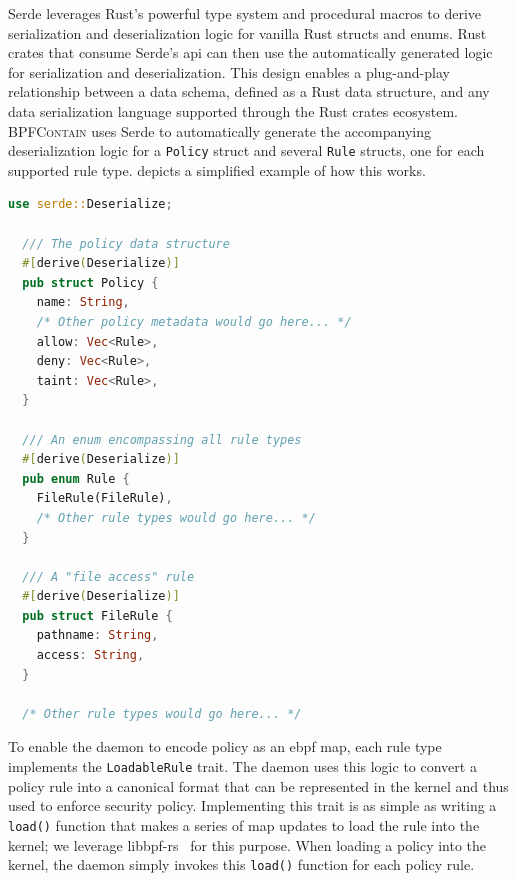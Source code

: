 \documentclass[
  fontsize=12pt,
  titlepage=firstiscover,
  paper=letter,
oneside,
  cleardoublepage=plain,
  parskip=half-,
  DIV=10,
  parindent,
  appendixprefix,
  chapterprefix,
  listof=totoc,
]{scrbook}
\newcommand{\bpfcontain}{\textsc{BPFContain}}
\begin{document}
Serde leverages Rust's powerful type system and procedural macros to derive serialization
and deserialization logic for vanilla Rust structs and enums. Rust crates that consume
Serde's \gls{api} can then use the automatically generated logic for serialization and
deserialization. This design enables a plug-and-play relationship between a data schema,
defined as a Rust data structure, and any data serialization language supported through the
Rust crates ecosystem. \bpfcontain{} uses Serde to automatically generate the accompanying
deserialization logic for a \texttt{Policy} struct and several \texttt{Rule} structs, one
for each supported rule type.  depicts a simplified example of
how this works.

\begin{lstlisting}[language=Rust, gobble=2, caption={[A simplified example of \bpfcontain{}'s policy deserialization logic]
  A simplified example of \bpfcontain{}'s policy deserialization logic. Policy rules are
  specified declaratively using Rust structs and the corresponding deserialization logic
  is automatically generated by the Serde crate using a simple decorator macro.
},
label={lst:bpfcontain-serde}]
  use serde::Deserialize;

  /// The policy data structure
  #[derive(Deserialize)]
  pub struct Policy {
    name: String,
    /* Other policy metadata would go here... */
    allow: Vec<Rule>,
    deny: Vec<Rule>,
    taint: Vec<Rule>,
  }

  /// An enum encompassing all rule types
  #[derive(Deserialize)]
  pub enum Rule {
    FileRule(FileRule),
    /* Other rule types would go here... */
  }

  /// A "file access" rule
  #[derive(Deserialize)]
  pub struct FileRule {
    pathname: String,
    access: String,
  }

  /* Other rule types would go here... */
\end{lstlisting}

To enable the daemon to encode policy as an \gls{ebpf} map, each rule type implements the
\texttt{LoadableRule} trait. The daemon uses this logic to convert a policy rule into
a canonical format that can be represented in the kernel and thus used to enforce security
policy. Implementing this trait is as simple as writing a \texttt{load()} function that
makes a series of map updates to load the rule into the kernel; we leverage
libbpf-rs~\cite{libbpf-rs} for this purpose. When loading a policy into the kernel, the
daemon simply invokes this \texttt{load()} function for each policy rule.
\end{document}
